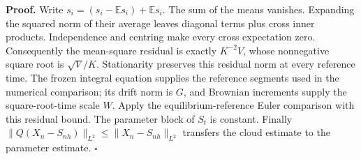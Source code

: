 \documentclass[11pt,a4paper]{report}
\begin{document}
\textbf{Proof.} Write \(s_i=(s_i-\mathbb Es_i)+\mathbb Es_i\). The sum of the means vanishes. Expanding the squared norm of their average leaves diagonal terms plus cross inner products. Independence and centring make every cross expectation zero. Consequently the mean-square residual is exactly \(K^{-2}V\), whose nonnegative square root is \(\sqrt V/K\). Stationarity preserves this residual norm at every reference time. The frozen integral equation supplies the reference segments used in the numerical comparison; its drift norm is \(G\), and Brownian increments supply the square-root-time scale \(W\). Apply the equilibrium-reference Euler comparison with this residual bound. The parameter block of \(S_t\) is constant. Finally \(\|Q(X_n-S_{nh})\|_{L^2}\le\|X_n-S_{nh}\|_{L^2}\) transfers the cloud estimate to the parameter estimate. \(\square\)
\end{document}
